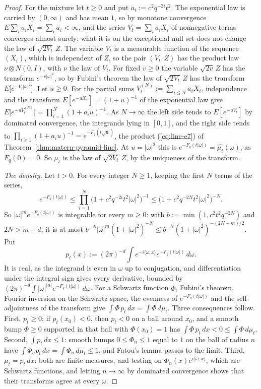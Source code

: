 \begin{proof}
For the mixture let $t \ge 0$ and put $a_i := c^2q^{-2i}t^2$. The exponential law is carried by
$(0, \infty)$ and has mean $1$, so by monotone convergence $E\sum_ia_iX_i = \sum_ia_i < \infty$, and
the series $V_t = \sum_ia_iX_i$ of nonnegative terms converges almost surely; what it is on the
exceptional null set does not change the law of $\sqrt{2V_t}\,Z$. The variable $V_t$ is a
measurable function of the sequence $(X_i)$, which is independent of $Z$, so the pair $(V_t, Z)$ has
the product law $\nu \otimes N(0, I)$, with $\nu$ the law of $V_t$. For fixed $v \ge 0$ the variable
$\sqrt{2v}\,Z$ has the transform $e^{-v|\omega|^2}$, so by Fubini's theorem the law of
$\sqrt{2V_t}\,Z$ has the transform $E\bigl[e^{-V_t|\omega|^2}\bigr]$. Let $u \ge 0$. For the
partial sums $V_t^{(N)} := \sum_{i \le N}a_iX_i$, independence and the transform
$E[e^{-uX_i}] = (1 + u)^{-1}$ of the exponential law give
$E\bigl[e^{-uV_t^{(N)}}\bigr] = \prod_{i=1}^N(1 + a_iu)^{-1}$. As $N \to \infty$ the left side tends
to $E[e^{-uV_t}]$ by dominated convergence, the integrands lying in $[0, 1]$, and the right side
tends to $\prod_{i \ge 1}(1 + a_iu)^{-1} = e^{-F_q(t\sqrt u)}$, the product (\ref{eq:line-e7}) of
Theorem~\ref{thm:matern-pyramid-line}. At $u = |\omega|^2$ this is
$e^{-F_q(t|\omega|)} = \widehat{\mu_t}(\omega)$, as $F_q(0) = 0$. So $\mu_t$ is the law of
$\sqrt{2V_t}\,Z$, by the uniqueness of the transform.

\emph{The density.} Let $t > 0$. For every integer $N \ge 1$, keeping the first $N$
terms of the series,
\[
  e^{-F_q(t|\omega|)} \le \prod_{i=1}^N\bigl(1 + c^2q^{-2i}t^2|\omega|^2\bigr)^{-1}
   \le \bigl(1 + c^2q^{-2N}t^2|\omega|^2\bigr)^{-N} .
\]
So $|\omega|^m e^{-F_q(t|\omega|)}$ is integrable for every $m \ge 0$: with $b := \min(1,
c^2t^2q^{-2N})$ and $2N > m + d$, it is at most
$b^{-N}|\omega|^m(1 + |\omega|^2)^{-N} \le b^{-N}(1 + |\omega|^2)^{-(2N - m)/2}$. Put
\[
  p_t(x) := (2\pi)^{-d}\int e^{-i\langle\omega, x\rangle}e^{-F_q(t|\omega|)}\,d\omega .
\]
It is real, as the integrand is even in $\omega$ up to conjugation, and differentiation under the
integral sign gives every derivative, bounded by
$(2\pi)^{-d}\int|\omega|^{|\alpha|}e^{-F_q(t|\omega|)}\,d\omega$. For a Schwartz function $\Phi$,
Fubini's theorem, Fourier inversion on the Schwartz space, the evenness of
$e^{-F_q(t|\omega|)}$ and the self-adjointness of the transform give
$\int\Phi\,p_t\,dx = \int\Phi\,d\mu_t$. Three consequences follow. First, $p_t \ge 0$: if
$p_t(x_0) < 0$, then $p_t < 0$ on a ball around $x_0$, and a smooth bump $\Phi \ge 0$ supported in
that ball with $\Phi(x_0) = 1$ has $\int\Phi\,p_t\,dx < 0 \le \int\Phi\,d\mu_t$. Second,
$\int p_t\,dx \le 1$: smooth bumps $0 \le \Phi_n \le 1$ equal to $1$ on the ball of radius $n$
have $\int\Phi_np_t\,dx = \int\Phi_n\,d\mu_t \le 1$, and Fatou's lemma passes to the limit. Third,
$\mu_t = p_t\,dx$: both are finite measures, and testing on $\Phi_n(x)e^{i\langle\omega, x\rangle}$,
which are Schwartz functions, and letting $n \to \infty$ by dominated convergence shows that their
transforms agree at every $\omega$.


\end{proof}
